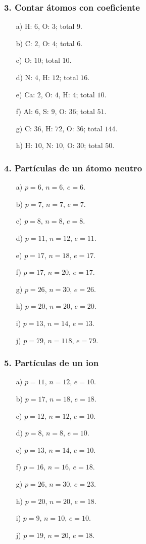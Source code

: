 \subsubsection*{3. Contar átomos con coeficiente}
\begin{enumerate}
    \item[a)] H: $6$, O: $3$; total $9$.
    \item[b)] C: $2$, O: $4$; total $6$.
    \item[c)] O: $10$; total $10$.
    \item[d)] N: $4$, H: $12$; total $16$.
    \item[e)] Ca: $2$, O: $4$, H: $4$; total $10$.
    \item[f)] Al: $6$, S: $9$, O: $36$; total $51$.
    \item[g)] C: $36$, H: $72$, O: $36$; total $144$.
    \item[h)] H: $10$, N: $10$, O: $30$; total $50$.
\end{enumerate}

\subsubsection*{4. Partículas de un átomo neutro}
\begin{enumerate}
    \item[a)] $p=6$, $n=6$, $e=6$.
    \item[b)] $p=7$, $n=7$, $e=7$.
    \item[c)] $p=8$, $n=8$, $e=8$.
    \item[d)] $p=11$, $n=12$, $e=11$.
    \item[e)] $p=17$, $n=18$, $e=17$.
    \item[f)] $p=17$, $n=20$, $e=17$.
    \item[g)] $p=26$, $n=30$, $e=26$.
    \item[h)] $p=20$, $n=20$, $e=20$.
    \item[i)] $p=13$, $n=14$, $e=13$.
    \item[j)] $p=79$, $n=118$, $e=79$.
\end{enumerate}

\subsubsection*{5. Partículas de un ion}
\begin{enumerate}
    \item[a)] $p=11$, $n=12$, $e=10$.
    \item[b)] $p=17$, $n=18$, $e=18$.
    \item[c)] $p=12$, $n=12$, $e=10$.
    \item[d)] $p=8$, $n=8$, $e=10$.
    \item[e)] $p=13$, $n=14$, $e=10$.
    \item[f)] $p=16$, $n=16$, $e=18$.
    \item[g)] $p=26$, $n=30$, $e=23$.
    \item[h)] $p=20$, $n=20$, $e=18$.
    \item[i)] $p=9$, $n=10$, $e=10$.
    \item[j)] $p=19$, $n=20$, $e=18$.
\end{enumerate}

